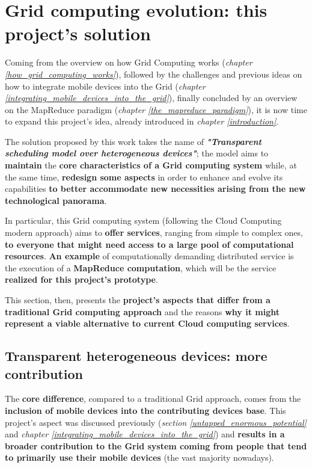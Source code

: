 \section{Grid computing evolution: this project's solution}
Coming from the overview on how Grid Computing works (\textit{chapter \ref{how_grid_computing_works}}), followed by the challenges and previous ideas on how to integrate mobile devices into the Grid (\textit{chapter \ref{integrating_mobile_devices_into_the_grid}}), finally concluded by an overview on the MapReduce paradigm (\textit{chapter \ref{the_mapreduce_paradigm}}), it is now time to expand this project's idea, already introduced in \textit{chapter \ref{introduction}}.

The solution proposed by this work takes the name of \textbf{\textit{"Transparent scheduling model over heterogeneous devices"}}; the model aims to \textbf{maintain} the \textbf{core characteristics of a Grid computing system} while, at the same time, \textbf{redesign some aspects} in order to enhance and evolve its capabilities \textbf{to better accommodate new necessities arising from the new technological panorama}.

In particular, this Grid computing system (following the Cloud Computing modern approach) aims to \textbf{offer services}, ranging from simple to complex ones, \textbf{to everyone that might need access to a large pool of computational resources}. \textbf{An example} of computationally demanding distributed service is the execution of a \textbf{MapReduce computation}, which will be the service \textbf{realized for this project's prototype}.

This section, then, presents the \textbf{project's aspects that differ from a traditional Grid computing approach} and the reasons \textbf{why it might represent a viable alternative to current Cloud computing services}.

\subsection{Transparent heterogeneous devices: more contribution}\label{transparent_heterogeneous_devices_more_contribution}
The \textbf{core difference}, compared to a traditional Grid approach, comes from the \textbf{inclusion of mobile devices into the contributing devices base}.
This project's aspect was discussed previously (\textit{section \ref{untapped_enormous_potential}} and \textit{chapter \ref{integrating_mobile_devices_into_the_grid}}) and \textbf{results in a broader contribution to the Grid system coming from people that tend to primarily use their mobile devices} (the vast majority nowadays).

